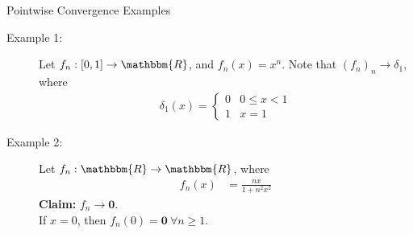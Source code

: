 \documentclass[10pt]{extarticle}
\renewcommand{\mathbf}[1]{\mathbold{#1}}
\newcommand{\R}{\mathbbm{R}}
\begin{document}
  \begin{problem}{Pointwise Convergence Examples}
    \begin{description}
      \item[Example 1:] Let $f_n: [0,1]\rightarrow\R$, and $f_n(x) = x^n$. Note that $(f_n)_n\rightarrow \delta_1$, where
        \begin{align*}
          \delta_1(x) = \begin{cases}
            0&0\leq x < 1\\
            1&x = 1
          \end{cases}
        \end{align*}
      \item[Example 2:] Let $f_n: \R \rightarrow \R$, where
        \begin{align*}
          f_n(x) &= \frac{nx}{1 + n^2x^2}
        \end{align*}
        \textbf{Claim:} $f_n \rightarrow \mathbf{0}$.\\

        If $x = 0$, then $f_n(0) = \mathbf{0}~\forall n\geq 1$.\\


\end{description}
\end{problem}
\end{document}
